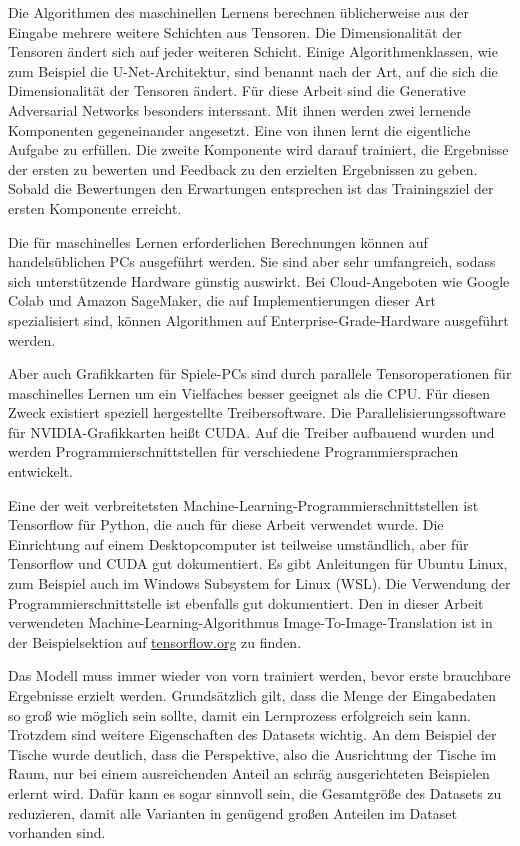 Die Algorithmen des maschinellen Lernens berechnen üblicherweise aus der Eingabe mehrere weitere Schichten aus Tensoren. Die Dimensionalität der Tensoren ändert sich auf jeder weiteren Schicht. Einige Algorithmenklassen, wie zum Beispiel die U-Net-Architektur, sind benannt nach der Art, auf die sich die Dimensionalität der Tensoren ändert. Für diese Arbeit sind die Generative Adversarial Networks besonders interssant. Mit ihnen werden zwei lernende Komponenten gegeneinander angesetzt. Eine von ihnen lernt die eigentliche Aufgabe zu erfüllen. Die zweite Komponente wird darauf trainiert, die Ergebnisse der ersten zu bewerten und Feedback zu den erzielten Ergebnissen zu geben. Sobald die Bewertungen den Erwartungen entsprechen ist das Trainingsziel der ersten Komponente erreicht.

Die für maschinelles Lernen erforderlichen Berechnungen können auf handelsüblichen PCs ausgeführt werden. Sie sind aber sehr umfangreich, sodass sich unterstützende Hardware günstig auswirkt. Bei Cloud-Angeboten wie Google Colab und Amazon SageMaker, die auf Implementierungen dieser Art spezialisiert sind, können Algorithmen auf Enterprise-Grade-Hardware ausgeführt werden.

Aber auch Grafikkarten für Spiele-PCs sind durch parallele Tensoroperationen für maschinelles Lernen um ein Vielfaches besser geeignet als die CPU. Für diesen Zweck existiert speziell hergestellte Treibersoftware. Die Parallelisierungssoftware für NVIDIA-Grafikkarten heißt CUDA. Auf die Treiber aufbauend wurden und werden Programmierschnittstellen für verschiedene Programmiersprachen entwickelt.

Eine der weit verbreitetsten Machine-Learning-Programmierschnittstellen ist Tensorflow für Python, die auch für diese Arbeit verwendet wurde. Die Einrichtung auf einem Desktopcomputer ist teilweise umständlich, aber für Tensorflow und CUDA gut dokumentiert. Es gibt Anleitungen für Ubuntu Linux, zum Beispiel auch im Windows Subsystem for Linux (WSL). Die Verwendung der Programmierschnittstelle ist ebenfalls gut dokumentiert. Den in dieser Arbeit verwendeten Machine-Learning-Algorithmus Image-To-Image-Translation ist in der Beispielsektion auf \href{https://tensorflow.org}{tensorflow.org} zu finden.

Das Modell muss immer wieder von vorn trainiert werden, bevor erste brauchbare Ergebnisse erzielt werden. Grundsätzlich gilt, dass die Menge der Eingabedaten so groß wie möglich sein sollte, damit ein Lernprozess erfolgreich sein kann. Trotzdem sind weitere Eigenschaften des Datasets wichtig. An dem Beispiel der Tische wurde deutlich, dass die Perspektive, also die Ausrichtung der Tische im Raum, nur bei einem ausreichenden Anteil an schräg ausgerichteten Beispielen erlernt wird. Dafür kann es sogar sinnvoll sein, die Gesamtgröße des Datasets zu reduzieren, damit alle Varianten in genügend großen Anteilen im Dataset vorhanden sind.

